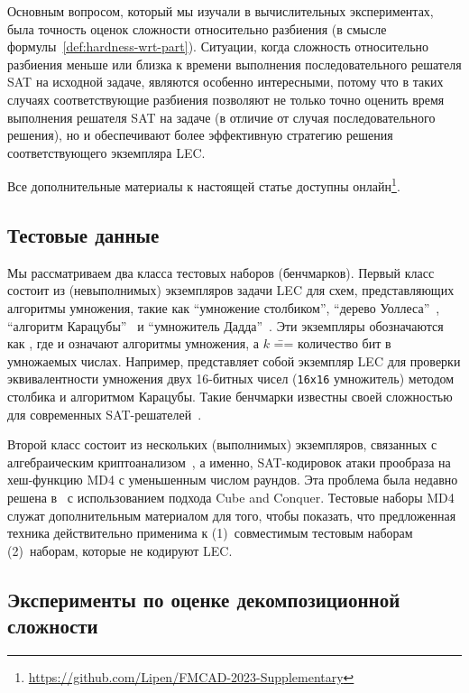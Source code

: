 Основным вопросом, который мы изучали в вычислительных экспериментах, была точность оценок сложности относительно разбиения (в смысле формулы~\eqref{def:hardness-wrt-part}).
Ситуации, когда сложность относительно разбиения меньше или близка к времени выполнения последовательного решателя SAT на исходной задаче, являются особенно интересными, потому что в таких случаях соответствующие разбиения позволяют не только точно оценить время выполнения решателя SAT на задаче (в отличие от случая последовательного решения), но и обеспечивают более эффективную стратегию решения соответствующего экземпляра LEC.

Все дополнительные материалы к настоящей статье доступны онлайн\footnote{\url{https://github.com/Lipen/FMCAD-2023-Supplementary}}.


\subsection{Тестовые данные}

Мы рассматриваем два класса тестовых наборов (бенчмарков).
Первый класс состоит из (невыполнимых) экземпляров задачи LEC для схем, представляющих алгоритмы умножения, такие как
\enquote{умножение столбиком}, \enquote{дерево Уоллеса}~\cite{cormen90}, \enquote{алгоритм Карацубы}~\cite{knuth1969} и \enquote{умножитель Дадда}~\cite{dadda1965}.
Эти экземпляры обозначаются как , где  и  означают алгоритмы умножения, а $k$ \=== количество бит в умножаемых числах.
Например,  представляет собой экземпляр LEC для проверки эквивалентности умножения двух 16-битных чисел (\texttt{16x16} умножитель) методом столбика и алгоритмом Карацубы.
Такие бенчмарки известны своей сложностью для современных SAT-решателей~\cite{kaufmann2019,CP2021}.

Второй класс состоит из нескольких (выполнимых) экземпляров, связанных с алгебраическим криптоанализом~\cite{bard2009}, а именно, SAT-кодировок атаки прообраза на хеш-функцию MD4 с уменьшенным числом раундов.
Эта проблема была недавно решена в~\cite{DBLP:conf/ijcai/Zaikin2022} с использованием подхода Cube and Conquer.
Тестовые наборы MD4 служат дополнительным материалом для того, чтобы показать, что предложенная техника действительно применима к (1)~совместимым тестовым наборам (2)~наборам, которые не кодируют LEC.

\subsection{Эксперименты по оценке декомпозиционной сложности}

